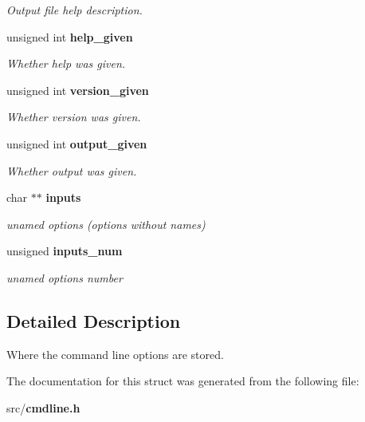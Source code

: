 \begin{CompactItemize}
\begin{CompactList}\small\item\em Output file help description. \item\end{CompactList}\item 
unsigned int \bf{help\_\-given}\label{structgengetopt__args__info_a68db6986862756882e8e791638a9f41}

\begin{CompactList}\small\item\em Whether help was given. \item\end{CompactList}\item 
unsigned int \bf{version\_\-given}\label{structgengetopt__args__info_a583e20df0ae366b2857713c91ada8fd}

\begin{CompactList}\small\item\em Whether version was given. \item\end{CompactList}\item 
unsigned int \bf{output\_\-given}\label{structgengetopt__args__info_4fa6734d3fbfa9eb8579c0b60cd399f0}

\begin{CompactList}\small\item\em Whether output was given. \item\end{CompactList}\item 
char $\ast$$\ast$ \bf{inputs}\label{structgengetopt__args__info_d2006fe41e83e15318973f9e8330936c}

\begin{CompactList}\small\item\em unamed options (options without names) \item\end{CompactList}\item 
unsigned \bf{inputs\_\-num}\label{structgengetopt__args__info_2dd241f1c9c1900401ee3abe0000df56}

\begin{CompactList}\small\item\em unamed options number \item\end{CompactList}\end{CompactItemize}


\subsection{Detailed Description}
Where the command line options are stored. 



The documentation for this struct was generated from the following file:\begin{CompactItemize}
\item 
src/\bf{cmdline.h}\end{CompactItemize}
